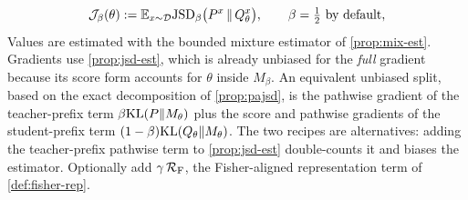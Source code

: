 \begin{definition}\label{def:pajsd}
\[
\mathcal{J}_\beta(\theta):=\mathbb{E}_{x\sim\mathcal{D}}\mathrm{JSD}_\beta\big(P^{x}\,\|\,Q^{x}_{\theta}\big),\qquad\beta=\tfrac12\text{ by default},
\]
Values are estimated with the bounded mixture estimator of \cref{prop:mix-est}. Gradients use
\cref{prop:jsd-est}, which is already unbiased for the \emph{full} gradient because its score form
accounts for $\theta$ inside $M_\beta$. An equivalent unbiased split, based on the exact decomposition of
\cref{prop:pajsd}, is the pathwise gradient of the teacher-prefix term $\beta\mathrm{KL}(P\|M_\theta)$ plus the score and
pathwise gradients of the student-prefix term $(1-\beta)\mathrm{KL}(Q_\theta\|M_\theta)$. The two recipes are alternatives:
adding the teacher-prefix pathwise term to \cref{prop:jsd-est} double-counts it and biases the estimator.
Optionally add $\gamma\,\mathcal{R}_{\mathrm{F}}$, the Fisher-aligned representation term of \cref{def:fisher-rep}.
\end{definition}

